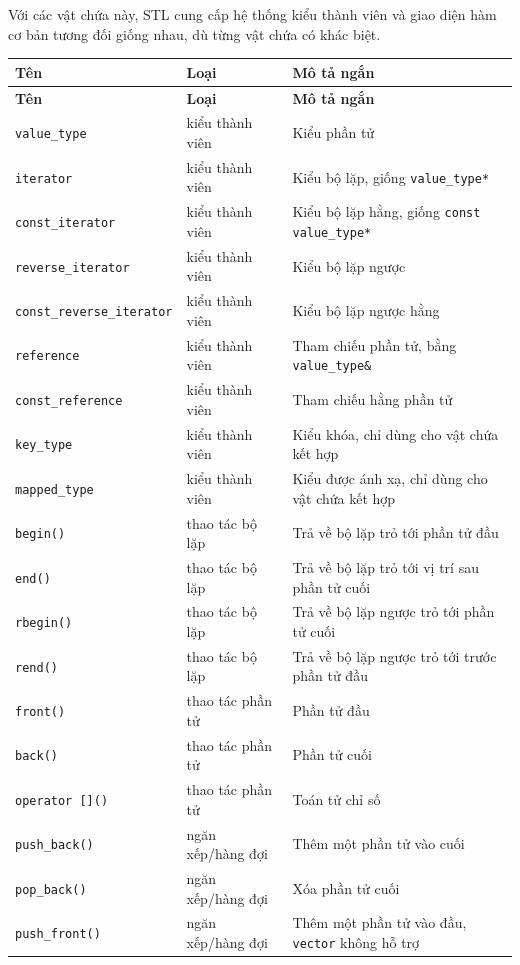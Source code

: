 \documentclass[11pt]{article}
\begin{document}
Với các vật chứa này, STL cung cấp hệ thống kiểu thành viên và giao diện hàm
cơ bản tương đối giống nhau, dù từng vật chứa có khác biệt.

\begin{longtable}{p{}p{}p{}}
\hline
\textbf{Tên} & \textbf{Loại} & \textbf{Mô tả ngắn}\\
\hline
\endfirsthead
\hline
\textbf{Tên} & \textbf{Loại} & \textbf{Mô tả ngắn}\\
\hline
\endhead
\verb|value_type| & kiểu thành viên & Kiểu phần tử\\
\verb|iterator| & kiểu thành viên & Kiểu bộ lặp, giống \verb|value_type*|\\
\verb|const_iterator| & kiểu thành viên & Kiểu bộ lặp hằng, giống \verb|const value_type*|\\
\verb|reverse_iterator| & kiểu thành viên & Kiểu bộ lặp ngược\\
\verb|const_reverse_iterator| & kiểu thành viên & Kiểu bộ lặp ngược hằng\\
\verb|reference| & kiểu thành viên & Tham chiếu phần tử, bằng \verb|value_type&|\\
\verb|const_reference| & kiểu thành viên & Tham chiếu hằng phần tử\\
\verb|key_type| & kiểu thành viên & Kiểu khóa, chỉ dùng cho vật chứa kết hợp\\
\verb|mapped_type| & kiểu thành viên & Kiểu được ánh xạ, chỉ dùng cho vật chứa kết hợp\\
\verb|begin()| & thao tác bộ lặp & Trả về bộ lặp trỏ tới phần tử đầu\\
\verb|end()| & thao tác bộ lặp & Trả về bộ lặp trỏ tới vị trí sau phần tử cuối\\
\verb|rbegin()| & thao tác bộ lặp & Trả về bộ lặp ngược trỏ tới phần tử cuối\\
\verb|rend()| & thao tác bộ lặp & Trả về bộ lặp ngược trỏ tới trước phần tử đầu\\
\verb|front()| & thao tác phần tử & Phần tử đầu\\
\verb|back()| & thao tác phần tử & Phần tử cuối\\
\verb|operator []()| & thao tác phần tử & Toán tử chỉ số\\
\verb|push_back()| & ngăn xếp/hàng đợi & Thêm một phần tử vào cuối\\
\verb|pop_back()| & ngăn xếp/hàng đợi & Xóa phần tử cuối\\
\verb|push_front()| & ngăn xếp/hàng đợi & Thêm một phần tử vào đầu, \verb|vector| không hỗ trợ\\

\end{longtable}
\end{document}
